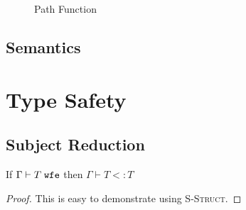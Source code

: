 \documentclass{llncs}
\begin{document}
\begin{figure}[h]
\caption{Path Function}
\label{f:path}
\end{figure}

\subsection{Semantics}













\section{Type Safety}

\subsection{Subject Reduction}

\begin{theorem}
 	If $\Gamma \vdash T \; \textbf{\tt{wfe}}$ then $\Gamma \vdash T <: T$
\end{theorem}
\begin{proof}
This is easy to demonstrate using \textsc{S-Struct}.
\end{proof}
\end{document}
